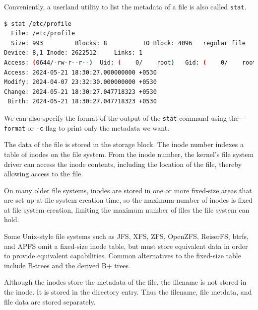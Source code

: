 Conveniently, a userland utility to list the metadata of a file is also called \texttt{stat}.

\begin{lstlisting}[language=bash]
$ stat /etc/profile
  File: /etc/profile
  Size: 993       	Blocks: 8          IO Block: 4096   regular file
Device: 8,1	Inode: 2622512     Links: 1
Access: (0644/-rw-r--r--)  Uid: (    0/    root)   Gid: (    0/    root)
Access: 2024-05-21 18:30:27.000000000 +0530
Modify: 2024-04-07 23:32:30.000000000 +0530
Change: 2024-05-21 18:30:27.047718323 +0530
 Birth: 2024-05-21 18:30:27.047718323 +0530
\end{lstlisting}

We can also specify the format of the output of the \texttt{stat} command using the \texttt{--format} or \texttt{-c} flag to print only the metadata we want.

The data of the file is stored in the storage block.
The inode number indexes a table of inodes on the file system.
From the inode number, the kernel's file system driver can access the inode contents, including the location of the file, thereby allowing access to the file.

On many older file systems, inodes are stored in one or more fixed-size areas that are set up at file system creation time, so the maximum number of inodes is fixed at file system creation, limiting the maximum number of files the file system can hold.

Some Unix-style file systems such as JFS, XFS, ZFS, OpenZFS, ReiserFS, btrfs, and APFS omit a fixed-size inode table, but must store equivalent data in order to provide equivalent capabilities. Common alternatives to the fixed-size table include B-trees and the derived B+ trees.

\begin{remark}
  Although the inodes store the metadata of the file, the filename is not stored in the inode.
  It is stored in the directory entry.
  Thus the filename, file metdata, and file data are stored separately.
\end{remark}

